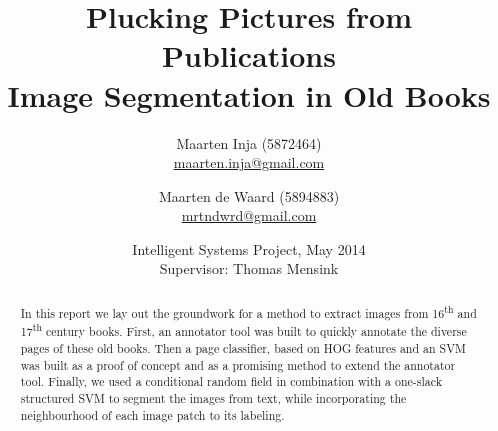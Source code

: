 \documentclass{article}
\title{Plucking Pictures from Publications\\ \large
Image Segmentation in Old Books}
\author{Maarten Inja (5872464)\\\small\url{maarten.inja@gmail.com} \and Maarten de
Waard (5894883)\\\small\url{mrtndwrd@gmail.com}}
\date{Intelligent Systems Project, May 2014\\
Supervisor: Thomas Mensink}
\begin{document}
\maketitle


\begin{abstract}
In this report we lay out the groundwork for a method to extract images
from 16\textsuperscript{th} and 17\textsuperscript{th} century books. First, an
annotator tool was built to quickly annotate the diverse pages of these old
books. Then a page classifier, based on HOG features and an SVM was built as a
proof of concept and as a promising method to extend the annotator tool.
Finally, we used a conditional random field in combination with a one-slack
structured SVM to segment the images from text, while incorporating the
neighbourhood of each image patch to its labeling.
\end{abstract}






















\newpage

\end{document}
